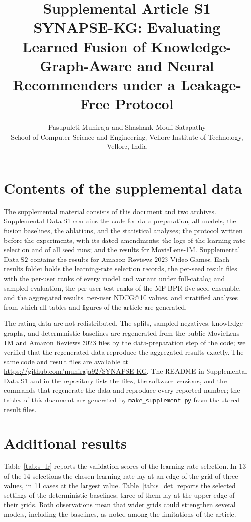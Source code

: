 \documentclass[10pt,a4paper]{article}
\title{Supplemental Article S1\\[0.4em]\large SYNAPSE-KG: Evaluating Learned Fusion of Knowledge-Graph-Aware and Neural Recommenders under a Leakage-Free Protocol}
\author{Pasupuleti Muniraja and Shashank Mouli Satapathy\\
\small School of Computer Science and Engineering, Vellore Institute of Technology, Vellore, India}
\date{}
\begin{document}
\maketitle

\section{Contents of the supplemental data}

The supplemental material consists of this document and two archives. Supplemental Data S1 contains the code for data preparation, all models, the fusion baselines, the ablations, and the statistical analyses; the protocol written before the experiments, with its dated amendments; the logs of the learning-rate selection and of all seed runs; and the results for MovieLens-1M. Supplemental Data S2 contains the results for Amazon Reviews 2023 Video Games. Each results folder holds the learning-rate selection records, the per-seed result files with the per-user ranks of every model and variant under full-catalog and sampled evaluation, the per-user test ranks of the MF-BPR five-seed ensemble, and the aggregated results, per-user NDCG@10 values, and stratified analyses from which all tables and figures of the article are generated.

The rating data are not redistributed. The splits, sampled negatives, knowledge graphs, and deterministic baselines are regenerated from the public MovieLens-1M and Amazon Reviews 2023 files by the data-preparation step of the code; we verified that the regenerated data reproduce the aggregated results exactly. The same code and result files are available at \url{https://github.com/muniraja92/SYNAPSE-KG}. The README in Supplemental Data S1 and in the repository lists the files, the software versions, and the commands that regenerate the data and reproduce every reported number; the tables of this document are generated by \texttt{make\_supplement.py} from the stored result files.

\section{Additional results}

Table~\ref{tab:s_lr} reports the validation scores of the learning-rate selection. In 13 of the 14 selections the chosen learning rate lay at an edge of the grid of three values, in 11 cases at the largest value. Table~\ref{tab:s_det} reports the selected settings of the deterministic baselines; three of them lay at the upper edge of their grids. Both observations mean that wider grids could strengthen several models, including the baselines, as noted among the limitations of the article.
\end{document}
